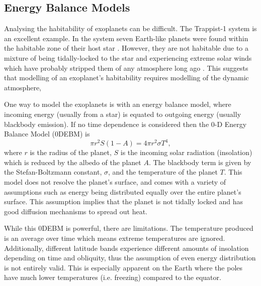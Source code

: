 \documentclass[12pt, onecolumn]{revtex4-2}    %
\begin{document}
\subsection{Energy Balance Models} \label{ssec:EBM_intro}
Analysing the habitability of exoplanets can be difficult.
The Trappist-1 system is an excellent example. In the system seven Earth-like planets were found within the habitable zone of their host star \cite{GTD2017}.
However, they are not habitable due to a mixture of being tidally-locked to the star and experiencing extreme solar winds which have probably stripped them of any atmosphere long ago \cite{Cohen2024, VanLooveren2024}.
This suggests that modelling of an exoplanet's habitability requires modelling of the dynamic atmosphere,

One way to model the exoplanets is with an energy balance model, where incoming energy (usually from a star) is equated to outgoing energy (usually blackbody emission).
If no time dependence is considered then the 0-D Energy Balance Model (0DEBM) is 
\begin{equation}
  \pi r^2 S(1-A) = 4 \pi r^2 \sigma T^4,
  \label{eq:0DEBM}
\end{equation}
where $r$ is the radius of the planet, $S$ is the incoming solar radiation (insolation) which is reduced by the albedo of the planet $A$.
The blackbody term is given by the Stefan-Boltzmann constant, $\sigma$, and the temperature of the planet $T$.
This model does not resolve the planet's surface, and comes with a variety of assumptions such as energy being distributed equally over the entire planet's surface.
This assumption implies that the planet is not tidally locked and has good diffusion mechanisms to spread out heat.

While this 0DEBM is powerful, there are limitations.
The temperature produced is an average over time which means extreme temperatures are ignored.
Additionally, different latitude bands experience different amounts of insolation depending on time and obliquity, thus the assumption of even energy distribution is not entirely valid.
This is especially apparent on the Earth where the poles have much lower temperatures (i.e. freezing) compared to the equator.
\end{document}
